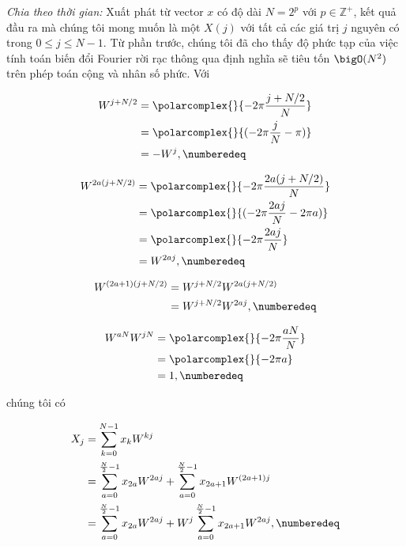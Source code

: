				\textit{Chia theo thời gian:} Xuất phát từ vector $x$ có độ dài $N = 2^p$ với $p \in \mathbb{Z}^+$, kết quả đầu ra mà chúng tôi mong muốn là một \spectrum{} $X(j)$ với tất cả các giá trị $j$ nguyên có trong $0 \le j \le N - 1$. Từ phần trước, chúng tôi đã cho thấy độ phức tạp của việc tính toán biến đổi Fourier rời rạc thông qua định nghĩa sẽ tiêu tốn $\bigO(N^2)$ trên phép toán cộng và nhân số phức. Với
				
					\begin{align*}
						W^{j + N/2} & = \polarcomplex{}{-2\pi \frac{j + N/2}{N}} \\
						& = \polarcomplex{}{(-2\pi \frac{j}{N} - \pi)} \\
						& = - W^j, \numberedeq
					\end{align*}
					
					\begin{align*}
						W^{2a(j + N/2)}		& = \polarcomplex{}{-2\pi \frac{2a(j + N/2)}{N}} \\
						& = \polarcomplex{}{(-2\pi \frac{2aj}{N} - 2\pi a)} \\
						& = \polarcomplex{}{-2\pi \frac{2aj}{N}} \\
						& = W^{2aj}, \numberedeq
					\end{align*}
					
					\begin{align*}
						W^{(2a + 1)(j + N/2)} 	& = W^{j + N/2} W^{2a(j + N/2)} \\
						& = W^{j + N/2} W^{2aj}, \numberedeq
					\end{align*}
				
					\begin{align*}
						W^{aN} 	W^{jN}	& = \polarcomplex{}{-2\pi \frac{aN}{N}} \\
						& = \polarcomplex{}{-2\pi a} \\
						& = 1, \numberedeq
					\end{align*}
				
				\noindent chúng tôi có
				
					\begin{align*}
						X_j & = \sum_{k=0}^{N - 1} x_k W^{kj} \\
							& = \sum_{a=0}^{\frac{N}{2} - 1} x_{2a} W^{2aj} + \sum_{a=0}^{\frac{N}{2} - 1} x_{2a + 1} W^{(2a + 1)j} \\
							& = \sum_{a=0}^{\frac{N}{2} - 1} x_{2a} W^{2aj} + W^j\sum_{a=0}^{\frac{N}{2} - 1} x_{2a + 1} W^{2aj}, \numberedeq
					\end{align*}
				
